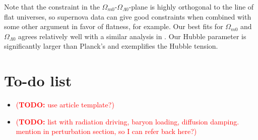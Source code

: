 \documentclass[10pt,a4paper]{article}
\newcommand\TODO[1]{\textcolor{red}{(\textbf{TODO:} #1)}}
\begin{document}
Note that the constraint in the $\Omega_{m0}$-$\Omega_{\Lambda0}$-plane is highly orthogonal to the line of flat universes,
so supernova data can give good constraints when combined with some other argument in favor of flatness, for example.
Our best fits for $\Omega_{m0}$ and $\Omega_{\Lambda0}$ agrees relatively well with a similar analysis in \cite[Fig. 15]{betouleImprovedCosmologicalConstraints2014}.
Our Hubble parameter is significantly larger than Planck's and exemplifies the Hubble tension.

\clearpage

\section{To-do list}

\begin{itemize}
\item \TODO{use article template?}

\item \TODO{list with radiation driving, baryon loading, diffusion damping. mention in perturbation section, so I can refer back here?}
\end{itemize}

\clearpage
%
\printbibliography
\end{document}
